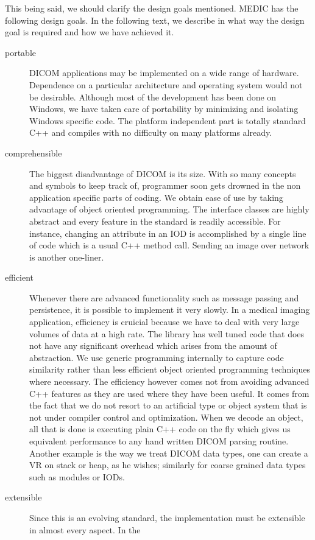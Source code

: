 \documentclass[a4paper,10pt]{article}
\begin{document}
This being said, we should clarify the design goals mentioned. MEDIC
has the following design goals. In the following text, we describe
in what way the design goal is required and how we have achieved it.
\begin{description}
\item[portable] DICOM applications may be implemented on a wide range
of hardware. Dependence on a particular architecture and operating
system would not be desirable. Although most of the development has
been done on Windows, we have taken care of portability by minimizing
and isolating Windows specific code. The platform independent part
is totally standard C++ and compiles with no difficulty on many
platforms already.
\item[comprehensible] The biggest disadvantage of DICOM is its
size. With so many concepts and symbols to keep track of, programmer
soon gets drowned in the non application specific parts of coding.
We obtain ease of use by taking advantage of object oriented
programming. The interface classes are highly abstract and every
feature in the standard is readily accessible. For instance, changing
an attribute in an IOD is accomplished by a single line
of code which is a usual C++ method call. Sending an image over
network is another one-liner.
\item[efficient] Whenever there are advanced functionality such as
 message passing and persistence, it is possible
to implement it very slowly. In a medical imaging application,
efficiency is cruicial because we have to deal with very large
volumes of data at a high rate.
The library has well tuned code that does
not have any significant overhead which arises from the amount of
abstraction. We use generic programming internally to capture
code similarity rather than less efficient object oriented programming
techniques where necessary. The efficiency however comes not
from avoiding advanced C++ features as they are used where they have
been useful. It comes from the fact that we do not resort to an
artificial type or object system that is not under compiler control
and optimization. When we decode an object, all that is done is
executing plain C++ code on the fly which gives us equivalent
performance to any hand written DICOM parsing routine. Another example
is the way we treat DICOM data types, one can create a VR on stack
or heap, as he wishes; similarly for coarse grained data types such
as modules or IODs.
\item[extensible] Since this is an evolving standard, the
  implementation must be extensible in almost every aspect. In the

\end{description}
\end{document}
